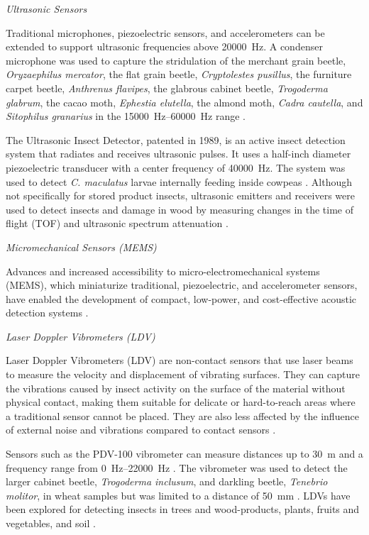 \documentclass[../Vibro-Acoustic Signatures and Detection Algorithms for Stored Product Insects.tex]{subfiles}
\begin{document}
\textit{Ultrasonic Sensors}

Traditional microphones, piezoelectric sensors, and accelerometers can be extended to support ultrasonic frequencies above \SI{20000}{\hertz}. A condenser microphone was used to capture the stridulation of the merchant grain beetle, \textit{Oryzaephilus mercator}, the flat grain beetle, \textit{Cryptolestes pusillus}, the furniture carpet beetle, \textit{Anthrenus flavipes}, the glabrous cabinet beetle, \textit{Trogoderma glabrum}, the cacao moth, \textit{Ephestia elutella}, the almond moth, \textit{Cadra cautella}, and \textit{Sitophilus granarius} in the \SIrange{15000}{60000}{\hertz} range \cite{wojcikTestsAudibleUltrasonic1968}.

The Ultrasonic Insect Detector, patented in 1989, is an active insect detection system that radiates and receives ultrasonic pulses. It uses a half-inch diameter piezoelectric transducer with a center frequency of \SI{40000}{\hertz}. The system was used to detect \textit{C. maculatus} larvae internally feeding inside cowpeas \cite{shadeUltrasonicInsectDetector1989,shadeDetectionHiddenInsect1990}. Although not specifically for stored product insects, ultrasonic emitters and receivers were used to detect insects and damage in wood by measuring changes in the time of flight (TOF) and ultrasonic spectrum attenuation \cite{liuReviewRecentSensing2017}.

\textit{Micromechanical Sensors (MEMS)}

Advances and increased accessibility to micro-electromechanical systems (MEMS), which miniaturize traditional, piezoelectric, and accelerometer sensors, have enabled the development of compact, low-power, and cost-effective acoustic detection systems \cite{balingbingDeterminingSoundSignatures2024, keerthanaAcousticDetectionCallosobruchus2025}.

\textit{Laser Doppler Vibrometers (LDV)}

Laser Doppler Vibrometers (LDV) are non-contact sensors that use laser beams to measure the velocity and displacement of vibrating surfaces. They can capture the vibrations caused by insect activity on the surface of the material without physical contact, making them suitable for delicate or hard-to-reach areas where a traditional sensor cannot be placed. They are also less affected by the influence of external noise and vibrations compared to contact sensors \cite{liuReviewRecentSensing2017}.

Sensors such as the PDV-100 vibrometer can measure distances up to \SI{30}{\meter} and a frequency range from \SIrange{0}{22000}{\hertz} \cite{liuReviewRecentSensing2017}. The vibrometer was used to detect the larger cabinet beetle, \textit{Trogoderma inclusum}, and darkling beetle, \textit{Tenebrio molitor}, in wheat samples but was limited to a distance of \SI{50}{\milli\meter} \cite{flynnAcousticMethodsInvasive2016}. LDVs have been explored for detecting insects in trees and wood-products, plants, fruits and vegetables, and soil \cite{mankinPerspectivePromiseCentury2011, sutinVibroacousticMethodsInsect2017, liuReviewRecentSensing2017, bhairaviRecentAdvancesExploration2020, mankinAutomatedApplicationsAcoustics2021, loganathanNonchemicalMethodsDisinfestation2025}.
\end{document}
